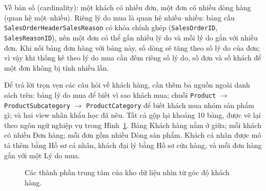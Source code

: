 Về bản số (cardinality): một khách có nhiều đơn, một đơn có nhiều dòng hàng (quan hệ một--nhiều). Riêng lý do mua là quan hệ nhiều--nhiều: bảng cầu \texttt{SalesOrderHeaderSalesReason} có khóa chính ghép (\texttt{SalesOrderID}, \texttt{SalesReasonID}), nên một đơn có thể gắn nhiều lý do và mỗi lý do gắn với nhiều đơn. Khi nối bảng đơn hàng với bảng này, số dòng sẽ tăng theo số lý do của đơn; vì vậy khi thống kê theo lý do mua cần đếm riêng số lý do, số đơn và số khách để một đơn không bị tính nhiều lần.

Để trả lời trọn vẹn các câu hỏi về khách hàng, cần thêm ba nguồn ngoài danh sách trên: bảng lý do mua để biết vì sao khách mua; chuỗi \texttt{Product} $\to$ \texttt{ProductSubcategory} $\to$ \texttt{ProductCategory} để biết khách mua nhóm sản phẩm gì; và hai view nhân khẩu học đã nêu. Tất cả gộp lại khoảng 10 bảng, được vẽ lại theo ngôn ngữ nghiệp vụ trong Hình~\ref{fig:erd}. Bảng Khách hàng nằm ở giữa; mỗi khách có nhiều Đơn hàng; mỗi đơn gồm nhiều Dòng sản phẩm. Khách cá nhân được mô tả thêm bằng Hồ sơ cá nhân, khách đại lý bằng Hồ sơ cửa hàng, và mỗi đơn hàng gắn với một Lý do mua.

\begin{figure}[H]
\centering
{}
\caption{Các thành phần trung tâm của kho dữ liệu nhìn từ góc độ khách hàng.}
\label{fig:erd}
\end{figure}

